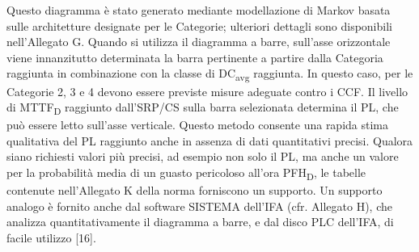 Questo diagramma è stato generato mediante modellazione di Markov basata sulle architetture designate per le Categorie; ulteriori dettagli sono disponibili nell'Allegato G. Quando si utilizza il diagramma a barre, sull'asse orizzontale viene innanzitutto determinata la barra pertinente a partire dalla Categoria raggiunta in combinazione con la classe di DC\textsubscript{avg} raggiunta. In questo caso, per le Categorie 2, 3 e 4 devono essere previste misure adeguate contro i CCF. Il livello di MTTF\textsubscript{D} raggiunto dall'SRP/CS sulla barra selezionata determina il PL, che può essere letto sull'asse verticale. Questo metodo consente una rapida stima qualitativa del PL raggiunto anche in assenza di dati quantitativi precisi. Qualora siano richiesti valori più precisi, ad esempio non solo il PL, ma anche un valore per la probabilità media di un guasto pericoloso all'ora PFH\textsubscript{D}, le tabelle contenute nell'Allegato K della norma forniscono un supporto. Un supporto analogo è fornito anche dal software SISTEMA dell'IFA (cfr. Allegato H), che analizza quantitativamente il diagramma a barre, e dal disco PLC dell'IFA, di facile utilizzo [16].

